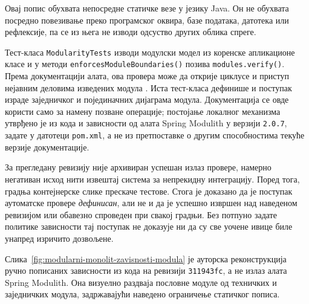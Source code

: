 \documentclass[12pt,oneside]{memoir}
\begin{document}
Овај попис обухвата непосредне статичке везе у језику {\lat Java}. Он не
обухвата посредно повезивање преко програмског оквира, базе података, датотека
или рефлексије, па се из њега не изводи одсуство других облика спреге.

Тест-класа \texttt{ModularityTests} изводи модулски модел из коренске
апликационе класе и у методи \texttt{enforcesModuleBoundaries()} позива
\mbox{\texttt{modules.verify()}}. Према документацији алата, ова провера може да
открије циклусе и приступ нејавним деловима изведених модула
\cite{springModulith2026fundamentals}. Иста тест-класа дефинише и поступак
израде заједничког и појединачних дијаграма модула. Документација се овде
користи само за намену позване операције; постојање локалног механизма утврђено
је из кода и зависности од алата {\lat Spring Modulith} у верзији
\texttt{2.0.7}, задате у датотеци \texttt{pom.xml}, а не из претпоставке о
другим способностима текуће верзије документације.


За прегледану ревизију није архивиран успешан излаз провере, намерно
негативан исход нити извештај система за непрекидну интеграцију. Поред тога,
градња контејнерске слике прескаче тестове. Стога је доказано да је поступак
аутоматске провере \emph{дефинисан}, али не и да је успешно извршен над
наведеном ревизијом или обавезно спроведен при свакој градњи. Без потпуно
задате политике зависности тај поступак не доказује ни да су све уочене ивице
биле унапред изричито дозвољене.


Слика~\ref{fig:modularni-monolit-zavisnosti-modula} је ауторска реконструкција
ручно пописаних зависности из кода на ревизији \texttt{311943fc}, а не излаз
алата {\lat Spring Modulith}. Она визуелно раздваја пословне модуле од
техничких и заједничких модула, задржавајући наведено ограничење статичког
пописа.
\end{document}
